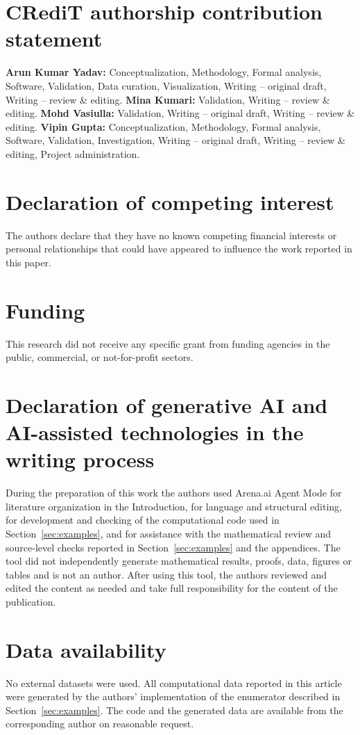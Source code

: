 \documentclass[preprint,12pt,a4paper]{elsarticle}
\theoremstyle{definition}
\theoremstyle{remark}
\begin{document}


\section*{CRediT authorship contribution statement}
\textbf{Arun Kumar Yadav:} Conceptualization, Methodology, Formal analysis,
Software, Validation, Data curation, Visualization, Writing -- original draft,
Writing -- review \& editing.
\textbf{Mina Kumari:} Validation, Writing -- review \& editing.
\textbf{Mohd Vasiulla:} Validation, Writing -- original draft, Writing --
review \& editing.
\textbf{Vipin Gupta:} Conceptualization, Methodology, Formal analysis,
Software, Validation, Investigation, Writing -- original draft, Writing --
review \& editing, Project administration.

\section*{Declaration of competing interest}
The authors declare that they have no known competing financial interests or
personal relationships that could have appeared to influence the work reported
in this paper.

\section*{Funding}
This research did not receive any specific grant from funding agencies in the
public, commercial, or not-for-profit sectors.

\section*{Declaration of generative AI and AI-assisted technologies in the
writing process}
During the preparation of this work the authors used Arena.ai Agent Mode for
literature organization in the Introduction, for language and structural
editing, for development and checking of the computational code used in
Section~\ref{sec:examples}, and for assistance with the mathematical review and
source-level checks reported in Section~\ref{sec:examples} and the appendices.
The tool did not independently generate mathematical results, proofs, data,
figures or tables and is not an author. After using this tool, the authors
reviewed and edited the content as needed and take full responsibility for the
content of the publication.

\section*{Data availability}
No external datasets were used. All computational data reported in this article
were generated by the authors' implementation of the enumerator described
in Section~\ref{sec:examples}. The code and the generated data are available
from the corresponding author on reasonable request.



\end{document}
